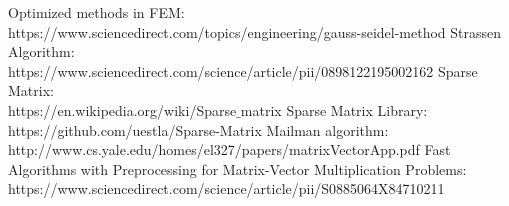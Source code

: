 \documentclass[10pt,a4paper]{article}
\begin{document}
\begin{thebibliography}{9}
 Optimized methods in FEM:\\
https://www.sciencedirect.com/topics/engineering/gauss-seidel-method
Strassen Algorithm:\\
https://www.sciencedirect.com/science/article/pii/0898122195002162
Sparse Matrix:\\
https://en.wikipedia.org/wiki/Sparse$\_$matrix
Sparse Matrix Library:\\
https://github.com/uestla/Sparse-Matrix
Mailman algorithm:\\
http://www.cs.yale.edu/homes/el327/papers/matrixVectorApp.pdf
Fast Algorithms with Preprocessing for Matrix-Vector Multiplication Problems:\\
https://www.sciencedirect.com/science/article/pii/S0885064X84710211
\end{thebibliography}
\end{document}
